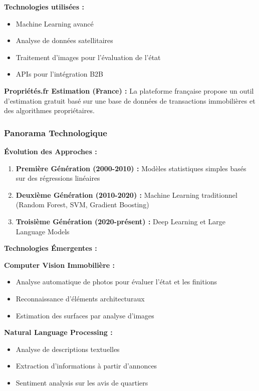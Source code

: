 \textbf{Technologies utilisées :}
\begin{itemize}
    \item Machine Learning avancé
    \item Analyse de données satellitaires
    \item Traitement d'images pour l'évaluation de l'état
    \item APIs pour l'intégration B2B
\end{itemize}

\textbf{Propriétés.fr Estimation (France) :}
La plateforme française propose un outil d'estimation gratuit basé sur une base de données de transactions immobilières et des algorithmes propriétaires.

\subsubsection{Panorama Technologique}

\textbf{Évolution des Approches :}

\begin{enumerate}
    \item \textbf{Première Génération (2000-2010) :} Modèles statistiques simples basés sur des régressions linéaires
    \item \textbf{Deuxième Génération (2010-2020) :} Machine Learning traditionnel (Random Forest, SVM, Gradient Boosting)
    \item \textbf{Troisième Génération (2020-présent) :} Deep Learning et Large Language Models
\end{enumerate}

\textbf{Technologies Émergentes :}

\textbf{Computer Vision Immobilière :}
\begin{itemize}
    \item Analyse automatique de photos pour évaluer l'état et les finitions
    \item Reconnaissance d'éléments architecturaux
    \item Estimation des surfaces par analyse d'images
\end{itemize}

\textbf{Natural Language Processing :}
\begin{itemize}
    \item Analyse de descriptions textuelles
    \item Extraction d'informations à partir d'annonces
    \item Sentiment analysis sur les avis de quartiers
\end{itemize}

